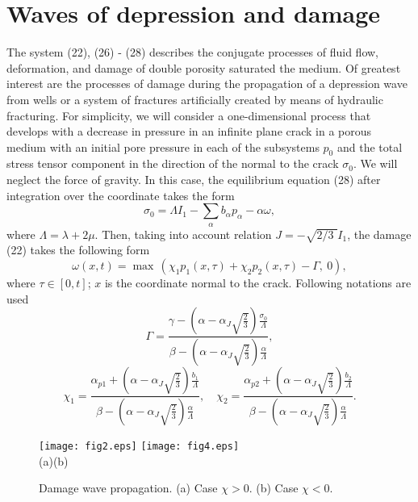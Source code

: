 \documentclass[article,authoryear,jpm]{beg_39}             %
\begin{document}
\section{Waves of depression and damage}
The system (22), (26) - (28) describes the conjugate processes of fluid flow, deformation, and damage of double porosity saturated the medium.
Of greatest interest are the processes of damage during the propagation of a depression wave from wells or a system of fractures artificially created by means of hydraulic fracturing.
For simplicity, we will consider a one-dimensional process that develops with a decrease in pressure in an infinite plane crack in a porous medium with an initial pore pressure in each of the subsystems $p_0$ and the total stress tensor component in the direction of the normal to the crack $\sigma_0$.
We will neglect the force of gravity.
In this case, the equilibrium equation (28) after integration over the coordinate takes the form
\begin{equation}
{{\sigma }_{0}}=\Lambda {{I}_{1}}-\sum\limits_{\alpha }{{{b}_{\alpha }}{{p}_{\alpha }}-\alpha \omega },
\end{equation}
where $\Lambda =\lambda +2\mu$.
Then, taking into account relation $J=-\sqrt{{2}/{3}\;}{{I}_{1}}$, the damage (22) takes the following form
\begin{equation}
\omega (x,t)={\mathop{\max }}\,\left( {{\chi }_{1}}{{p}_{1}}(x,\tau )+{{\chi }_{2}}{{p}_{2}}(x,\tau )-\Gamma ,\ 0 \right),
\end{equation}
where $\tau \in [0,t]$; $x$ is the coordinate normal to the crack. Following notations are used
\begin{equation}
\Gamma =\frac{\gamma -\left( \alpha -{{\alpha }_{J}}\sqrt{\frac{2}{3}} \right)\frac{{{\sigma }_{0}}}{\Lambda }}{\beta -\left( \alpha -{{\alpha }_{J}}\sqrt{\frac{2}{3}} \right)\frac{\alpha }{\Lambda }},
\end{equation}
\begin{equation}
 {{\chi }_{1}}=\frac{{{\alpha }_{p1}}+\left( \alpha -{{\alpha }_{J}}\sqrt{\frac{2}{3}} \right)\frac{{{b}_{1}}}{\Lambda }}{\beta -\left( \alpha -{{\alpha }_{J}}\sqrt{\frac{2}{3}} \right)\frac{\alpha}{\Lambda }},\quad {{\chi}_{2}}=\frac{{{\alpha }_{p2}}+\left( \alpha -{{\alpha}_{J}}\sqrt{\frac{2}{3}} \right)\frac{{{b}_{2}}}{\Lambda }}{\beta -\left( \alpha -{{\alpha}_{J}}\sqrt{\frac{2}{3}} \right)\frac{\alpha }{\Lambda}}.
\end{equation}
\begin{figure}[!b]
	\centering
\texttt{[image: fig2.eps]} %
\texttt{[image: fig4.eps]} \\
  (a)\hspace*{220pt}(b)
\caption{Damage wave propagation. (a) Case $\chi>0$. (b)  Case $\chi<0$.}
\label{fig1}
\end{figure}
\end{document}
